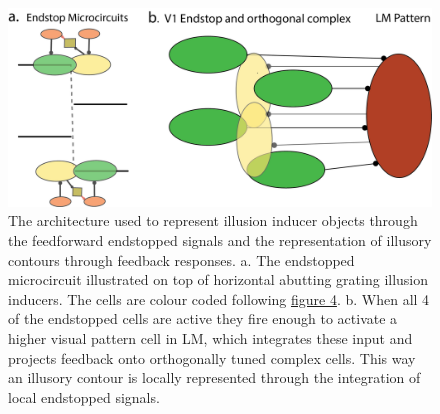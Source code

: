 \documentclass[12pt]{article}
\begin{document}
\vspace{20pt}
\begin{figure}[H]
  \centering
  \includegraphics[width=1 \textwidth]{adjusted_figures/illusory_filling.png}
  \caption{The architecture used to represent illusion inducer objects through the feedforward endstopped signals and the representation of illusory contours through feedback responses. a. The endstopped microcircuit illustrated on top of horizontal abutting grating illusion inducers. The cells are colour coded following \hyperref[fig:LIF_Overview]{figure 4}. b. When all 4 of the endstopped cells are active they fire enough to activate a higher visual pattern cell in LM, which integrates these input and projects feedback onto orthogonally tuned complex cells. This way an illusory contour is locally represented through the integration of local endstopped signals.}
  \label{fig:illusory_filling}
\end{figure}
\newpage
\end{document}
